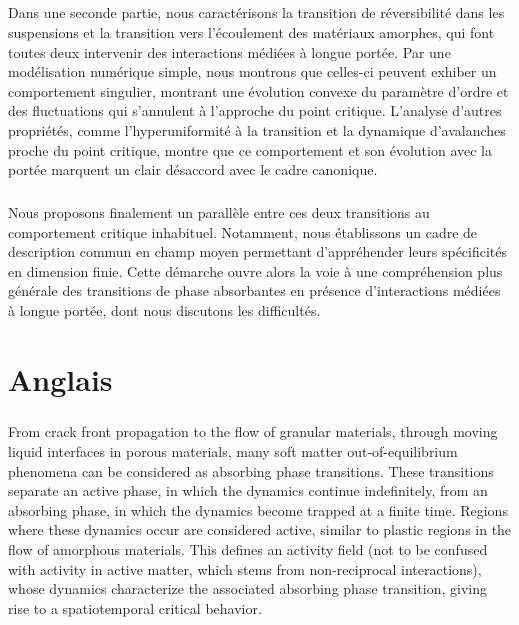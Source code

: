 \documentclass[10pt,a4paper]{article}
\begin{document}
\subparagraph{}Dans une seconde partie, nous caractérisons la transition de réversibilité dans les suspensions et la transition vers l’écoulement des matériaux amorphes, qui font toutes deux intervenir des interactions médiées à longue portée.  Par une modélisation numérique simple, nous montrons que celles-ci peuvent exhiber un comportement singulier, montrant une évolution convexe du paramètre d'ordre et des fluctuations qui s'annulent à l'approche du point critique. L'analyse d'autres propriétés, comme l'hyperuniformité à la transition et la dynamique d'avalanches proche du point critique, montre que ce comportement et son évolution avec la portée marquent un clair désaccord avec le cadre canonique. 

\subparagraph{}Nous proposons finalement un parallèle entre ces deux transitions au comportement critique inhabituel. Notamment, nous établissons un cadre de description commun en champ moyen permettant d'appréhender leurs spécificités en dimension finie. Cette démarche ouvre alors la voie à une compréhension plus générale des transitions de phase absorbantes en présence d'interactions médiées à longue portée, dont nous discutons les difficultés.

\section{Anglais}

\subparagraph{}From crack front propagation to the flow of granular materials, through moving liquid interfaces in porous materials, many soft matter out-of-equilibrium phenomena can be considered as absorbing phase transitions. These transitions separate an active phase, in which the dynamics continue indefinitely, from an absorbing phase, in which the dynamics become trapped at a finite time. Regions where these dynamics occur are considered active, similar to plastic regions in the flow of amorphous materials. This defines an activity field (not to be confused with activity in active matter, which stems from non-reciprocal interactions), whose dynamics characterize the associated absorbing phase transition, giving rise to a spatiotemporal critical behavior.
\end{document}
